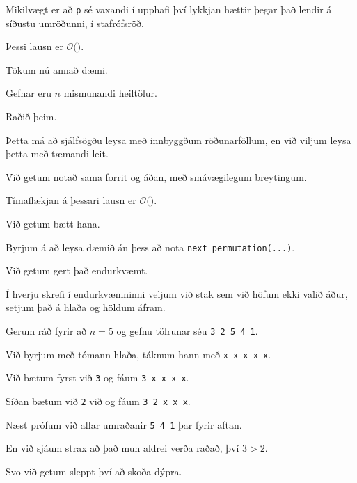 {
}

{
	{
		\item<1-> Mikilvægt er að \texttt{p} sé vaxandi í upphafi því lykkjan hættir þegar það lendir á síðustu umröðunni, í stafrófsröð.
		\item<2-> Þessi lausn er $\mathcal{O}($\onslide<3->{$(n + 1)!$}$)$.
	}
}

{
	{
		\item<1-> Tökum nú annað dæmi.
		\item<2-> Gefnar eru $n$ mismunandi heiltölur.
		\item<3-> Raðið þeim.
		\item<4-> Þetta má að sjálfsögðu leysa með innbyggðum röðunarföllum, en við viljum leysa þetta með tæmandi leit.
		\item<5-> Við getum notað sama forrit og áðan, með smávægilegum breytingum.
	}
}

{
}

{
	{
		\item<1-> Tímaflækjan á þessari lausn er $\mathcal{O}($\onslide<2->{$(n + 1)!$}$)$.
		\item<3-> Við getum bætt hana.
		\item<4-> Byrjum á að leysa dæmið án þess að nota \texttt{next\_permutation(...)}.
		\item<5-> Við getum gert það endurkvæmt.
		\item<6-> Í hverju skrefi í endurkvæmninni veljum við stak sem við höfum ekki valið áður, setjum það á hlaða og höldum áfram.
	}
}

{
}

{
	{
		\item<1-> Gerum ráð fyrir að $n = 5$ og gefnu tölrunar séu \texttt{3 2 5 4 1}.
		\item<2-> Við byrjum með tómann hlaða, táknum hann með \texttt{x x x x x}.
		\item<3-> Við bætum fyrst við \texttt{3} og fáum \texttt{3 x x x x}.
		\item<4-> Síðan bætum við \texttt{2} við og fáum \texttt{3 2 x x x}.
		\item<5-> Næst prófum við allar umraðanir \texttt{5 4 1} þar fyrir aftan.
		\item<6-> En við sjáum strax að það mun aldrei verða raðað, því $3 > 2$.
		\item<7-> Svo við getum sleppt því að skoða dýpra.
	}
}

